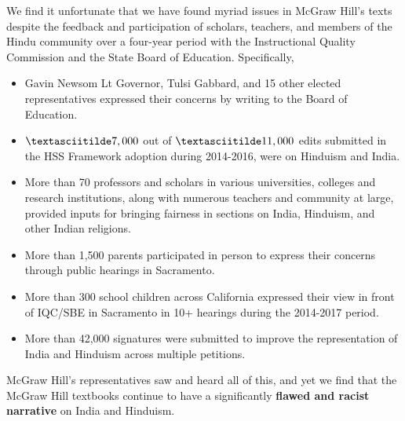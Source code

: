 We find it unfortunate that we have found myriad issues in McGraw Hill’s texts despite the feedback and participation of scholars, teachers, and members of the Hindu community over a four-year period with the Instructional Quality Commission and the State Board of Education. Specifically, 
\begin{itemize} 
\item Gavin Newsom Lt Governor, Tulsi Gabbard, and 15 other elected representatives expressed their concerns by writing to the Board of Education.
\item $\textasciitilde 7,000$ out of $\textasciitilde 11,000$ edits submitted in the HSS Framework adoption during 2014-2016, were on Hinduism and India.
\item More than 70 professors and scholars in various universities, colleges and research institutions, along with numerous teachers and community at large, provided inputs for bringing fairness in sections on India, Hinduism, and other Indian religions.
\item More than 1,500 parents participated in person to express their concerns through public hearings in Sacramento.
\item More than 300 school children across California expressed their view in front of IQC/SBE in Sacramento in 10+ hearings during the 2014-2017 period.
\item More than 42,000 signatures were submitted to improve the representation of India and Hinduism across multiple petitions.
\end{itemize}
McGraw Hill’s representatives saw and heard all of this, and yet we find that the McGraw Hill textbooks continue to have a significantly \textbf{flawed and racist narrative} on India and Hinduism.

